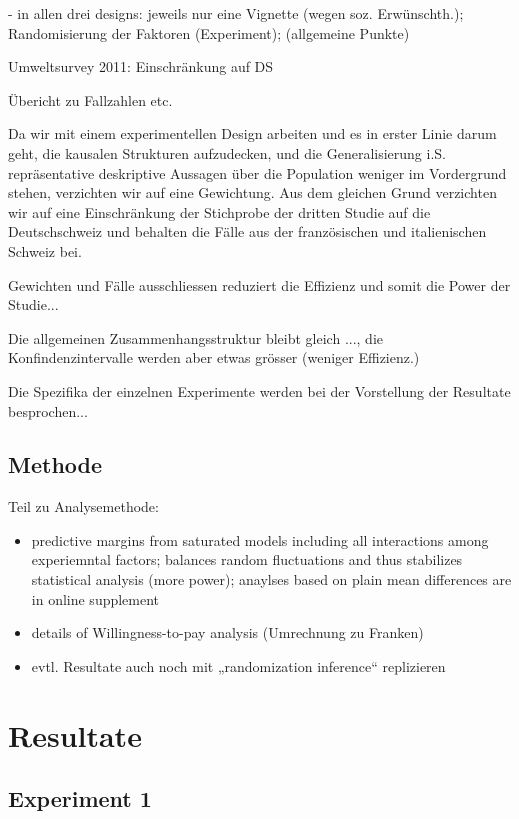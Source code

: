 \documentclass[a4paper,12pt]{article}
\renewcommand{\baselinestretch}{1.1}
\newif\ifcomments
\newcommand{\comment}[1]{%
    \ifcomments\marginpar{\renewcommand{\baselinestretch}{1}\tiny\hspace*{-1.1em}\colorbox{gray!20}%
    {\textcolor{red}{\parbox[t]{.9in}{\raggedright #1}}}}\fi}
\begin{document}
- in allen drei designs: jeweils nur eine Vignette (wegen soz. Erwünschth.); Randomisierung der Faktoren (Experiment); (allgemeine Punkte)

Umweltsurvey 2011: Einschränkung auf DS

Übericht zu Fallzahlen etc.

Da wir mit einem experimentellen Design arbeiten und es in erster Linie darum geht,
die kausalen Strukturen aufzudecken, und die Generalisierung i.S. 
repräsentative deskriptive Aussagen über die Population weniger im Vordergrund stehen, verzichten wir auf eine Gewichtung.
Aus dem gleichen Grund verzichten wir auf eine Einschränkung der Stichprobe der dritten Studie auf die Deutschschweiz und 
behalten die Fälle aus der französischen und italienischen Schweiz bei.

Gewichten und Fälle ausschliessen reduziert die Effizienz und somit die Power der Studie...

Die allgemeinen Zusammenhangsstruktur bleibt gleich ..., die Konfindenzintervalle werden aber etwas grösser (weniger Effizienz.)

Die Spezifika der einzelnen Experimente werden bei der Vorstellung der Resultate besprochen... \comment{also meinst Du hier die Inhalte? Hab ich jetzt mal oben...}

\subsection{Methode}
\label{sec:ss7}
Teil zu Analysemethode: 
\begin{itemize}
    \item predictive margins from saturated models including all interactions among experiemntal factors; balances random 
fluctuations and thus stabilizes statistical analysis (more power); anaylses based on plain mean differences are in online supplement 
    \item details of Willingness-to-pay analysis (Umrechnung zu Franken)
    \item evtl. Resultate auch noch mit „randomization inference“ replizieren
\end{itemize}


\section{Resultate}
\label{sec:s4}

\subsection{Experiment 1}
\label{sec:ss8}
\comment{Teile der Beschreibung der Daten könnten in den Abschnitt „Daten und Methode“ -> hab ich verschoben}
\end{document}
